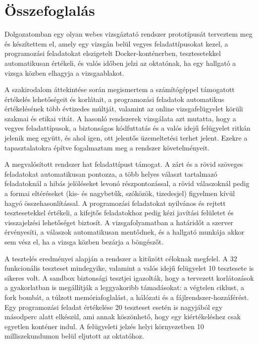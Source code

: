 \chapter{Összefoglalás}
\label{ch:osszefoglalas}

Dolgozatomban egy olyan webes vizsgáztató rendszer prototípusát terveztem meg és készítettem el,
amely egy vizsgán belül vegyes feladattípusokat kezel, a programozási feladatokat elszigetelt
Docker-konténerben, tesztesetekkel automatikusan értékeli, és valós időben jelzi az oktatónak, ha
egy hallgató a vizsga közben elhagyja a vizsgaablakot.

A szakirodalom áttekintése során megismertem a számítógéppel támogatott értékelés lehetőségeit
és korlátait, a programozási feladatok automatikus értékelésének több évtizedes múltját, valamint
az online vizsgafelügyelet körüli szakmai és etikai vitát. A hasonló rendszerek vizsgálata azt
mutatta, hogy a vegyes feladattípusok, a biztonságos kódfuttatás és a valós idejű felügyelet
ritkán jelenik meg együtt, és ahol igen, ott jelentős üzemeltetési terhet jelent. Ezekre a
tapasztalatokra építve fogalmaztam meg a rendszer követelményeit.

A megvalósított rendszer hat feladattípust támogat. A zárt és a rövid szöveges feladatokat
automatikusan pontozza, a több helyes választ tartalmazó feladatoknál a hibás jelöléseket levonó
részpontozással, a rövid válaszoknál pedig a formai eltéréseket (kis- és nagybetűk, szóközök,
tizedesjel) figyelmen kívül hagyó összehasonlítással. A programozási feladatokat nyilvános és
rejtett tesztesetekkel értékeli, a kifejtős feladatokhoz pedig kézi javítási felületet és
visszajelzési lehetőséget biztosít. A vizsgafolyamatban a határidőt a szerver érvényesíti, a
válaszok automatikusan mentődnek, és a hallgató munkája akkor sem vész el, ha a vizsga közben
bezárja a böngészőt.

A tesztelés eredményei alapján a rendszer a kitűzött céloknak megfelel. A 32 funkcionális
teszteset mindegyike, valamint a valós idejű felügyelet 10 tesztesete is sikeres volt. A sandbox
biztonsági tesztjei igazolták, hogy a tervezett korlátozások a gyakorlatban is megállítják a
leggyakoribb támadásokat: a végtelen ciklust, a fork bombát, a túlzott memóriafoglalást, a hálózati
és a fájlrendszer-hozzáférést. Egy programozási feladat értékelése 20 teszteset esetén is
nagyjából egy másodperc alatt elkészül, ami annak köszönhető, hogy egy kiértékeléshez csak
egyetlen konténer indul. A felügyeleti jelzés helyi környezetben 10 milliszekundumon belül
eljutott az oktatóhoz.


